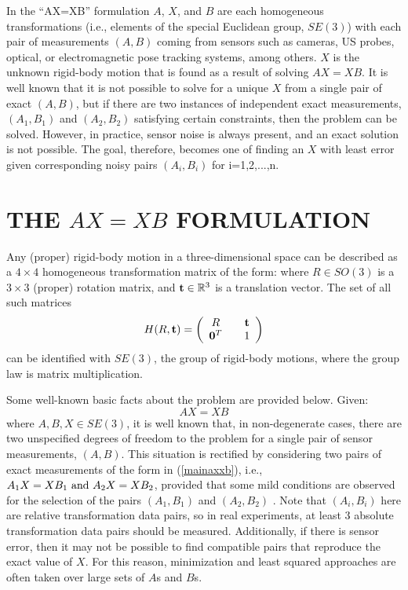 \documentclass[twocolumn,10pt]{asme2ej}
\newcommand{\ttt}{{\bf t}}
\begin{document}
In the ``AX=XB'' formulation $A$, $X$, and $B$ are each homogeneous transformations (i.e., elements of the special Euclidean group, $SE(3)$) with each pair of measurements $(A,B)$ coming from sensors such as cameras, US probes, optical, or electromagnetic pose tracking systems, among others. $X$ is the unknown rigid-body motion that is found as a result of solving $AX=XB$. It is well known that it is not possible to solve for
a unique $X$ from a single pair of exact $(A,B)$, but if there are two instances of independent exact measurements, $(A_1,B_1)$ and $(A_2,B_2)$ satisfying certain constraints,
then the problem can be solved. However, in practice, sensor noise is always present, and an exact solution is not possible. The goal, therefore, becomes one of finding
an $X$ with least error given corresponding noisy pairs $(A_i, B_i)$ for i=1,2,...,n.


\section{THE $AX=XB$ FORMULATION}
\noindent Any (proper) rigid-body motion in a three-dimensional space can be described as a $4 \times 4$ homogeneous transformation matrix of the form: where $R \in SO(3)$ is a $3\times 3$ (proper) rotation matrix, and ${\bf t} \in \mathbb{R}^3$ is a translation vector. The set of all such matrices
\begin{equation} 
H(R, \ttt) = \left(
\begin{array}{ccc}
R && {\bf t} \\
{\bf 0}^T && 1 
\end{array} 
\right)
\label{homotrans} 
\end{equation}
can be identified with $SE(3)$, the group of rigid-body motions, where the group law is matrix multiplication.

Some well-known basic facts about the problem are provided below. 
Given:
\begin{equation}
A X = X B
\label{mainaxxb}
\end{equation}
where $A,  B, X \in SE(3)$, it is well known that, in non-degenerate cases, there are two unspecified degrees of freedom to the problem for a single pair of sensor measurements, $(A,B)$. This situation is rectified by considering two pairs of exact measurements of the form in (\ref{mainaxxb}), i.e., $ {A_1}X=X{B_1} {\rm \,\, and \,\,} {A_2}X = X{B_2} $, provided that some mild conditions are observed for the selection of the pairs $(A_1,B_1)$ and $(A_2,B_2)$ \cite{chen91,park1994robot,shiu1989calibration}. Note that $(A_i, B_i)$ here are relative transformation data pairs, so in real experiments, at least 3 absolute transformation data pairs should be measured. Additionally, if there is sensor error, then it may not be possible to find compatible pairs that reproduce the exact value of $X$. For this reason, minimization and least squared approaches are often taken over large sets of $A$s and $B$s.
\end{document}
